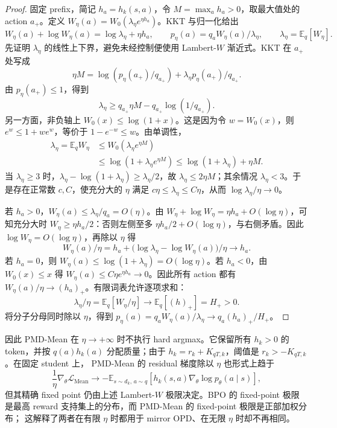 \documentclass[lang=cn,scheme=chinese,openany]{../book/elegantbook}
\newcommand{\E}{\mathbb E}
\begin{document}
\begin{proof}
固定 prefix，简记 $h_a=h_k(s,a)$，令 $M=\max_a h_a>0$，取最大值处的 action $a_+$。定义 $W_\eta(a)=W_0(\lambda_\eta e^{\eta h_a})$。KKT 与归一化给出
\begin{equation}
W_\eta(a)+\log W_\eta(a)=\log\lambda_\eta+\eta h_a,\qquad
p_\eta(a)=q_aW_\eta(a)/\lambda_\eta,\qquad
\lambda_\eta=\E_q[W_\eta].
\end{equation}
先证明 $\lambda_\eta$ 的线性上下界，避免未经控制便使用 Lambert-$W$ 渐近式。KKT 在 $a_+$ 处写成
\begin{equation}
\eta M=\log(p_\eta(a_+)/q_{a_+})+\lambda_\eta p_\eta(a_+)/q_{a_+}.
\end{equation}
由 $p_\eta(a_+)\le1$，得到
\begin{equation}
\lambda_\eta\ge q_{a_+}\eta M-q_{a_+}\log(1/q_{a_+}).
\end{equation}
另一方面，非负轴上 $W_0(x)\le\log(1+x)$。这是因为令 $w=W_0(x)$，则 $e^w\le1+we^w$，等价于 $1-e^{-w}\le w$。由单调性，
\begin{align}
\lambda_\eta=\E_qW_\eta
&\le W_0(\lambda_\eta e^{\eta M})\\
&\le\log(1+\lambda_\eta e^{\eta M})
\le\log(1+\lambda_\eta)+\eta M.
\end{align}
当 $\lambda_\eta\ge3$ 时，$\lambda_\eta-\log(1+\lambda_\eta)\ge\lambda_\eta/2$，故 $\lambda_\eta\le2\eta M$；其余情况 $\lambda_\eta<3$。于是存在正常数 $c,C$，使充分大的 $\eta$ 满足 $c\eta\le\lambda_\eta\le C\eta$，从而 $\log\lambda_\eta/\eta\to0$。

若 $h_a>0$，$W_\eta(a)\le\lambda_\eta/q_a=O(\eta)$。由 $W_\eta+\log W_\eta=\eta h_a+O(\log\eta)$，可知充分大时 $W_\eta\ge\eta h_a/2$：否则左侧至多 $\eta h_a/2+O(\log\eta)$，与右侧矛盾。因此 $\log W_\eta=O(\log\eta)$，再除以 $\eta$ 得
\begin{equation}
W_\eta(a)/\eta=h_a+\bigl(\log\lambda_\eta-\log W_\eta(a)\bigr)/\eta\longrightarrow h_a.
\end{equation}
若 $h_a=0$，则 $W_\eta(a)\le\log(1+\lambda_\eta)=O(\log\eta)$。若 $h_a<0$，由 $W_0(x)\le x$ 得 $W_\eta(a)\le C\eta e^{\eta h_a}\to0$。因此所有 action 都有 $W_\eta(a)/\eta\to(h_a)_+$。有限词表允许逐项求和：
\begin{equation}
\lambda_\eta/\eta=\E_q[W_\eta/\eta]\longrightarrow\E_q[(h)_+]=H_+>0.
\end{equation}
将分子分母同时除以 $\eta$，得到 $p_\eta(a)=q_aW_\eta(a)/\lambda_\eta\to q_a(h_a)_+/H_+$。
\end{proof}

因此 PMD-Mean 在 $\eta\to+\infty$ 时不执行 hard argmax。它保留所有 $h_k>0$ 的 token，并按 $q(a)h_k(a)$ 分配质量；由于 $h_k=r_k+K_{qT,k}$，阈值是 $r_k>-K_{qT,k}$。在固定 student 上， PMD-Mean 的 residual 梯度除以 $\eta$ 也形式上趋于
\begin{equation}
\frac1\eta\nabla_\theta\mathcal L_{\mathrm{Mean}}
\longrightarrow
-\mathbb E_{s\sim d_k,\,a\sim q}
\left[h_k(s,a)\nabla_\theta\log p_\theta(a\mid s)\right],
\end{equation}
但其精确 fixed point 仍由上述 Lambert-$W$ 极限决定。BPO 的 fixed-point 极限 是最高 reward 支持集上的分布，而 PMD-Mean 的 fixed-point 极限是正部加权分布； 这解释了两者在有限 $\eta$ 时都用于 mirror OPD、在无限 $\eta$ 时却不再相同。
\end{document}
